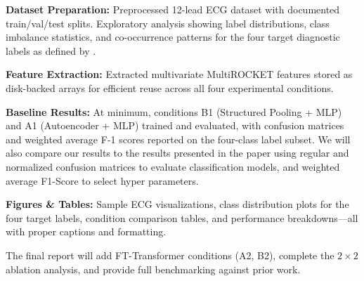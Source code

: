 \documentclass[10pt,twocolumn,letterpaper]{article}
\begin{document}
\textbf{Dataset Preparation:} Preprocessed 12-lead ECG dataset with documented train/val/test splits. Exploratory analysis showing label distributions, class imbalance statistics, and co-occurrence patterns for the four target diagnostic labels as defined by \cite{zheng2022}.

\textbf{Feature Extraction:} Extracted multivariate MultiROCKET features stored as disk-backed arrays for efficient reuse across all four experimental conditions.

\textbf{Baseline Results:} At minimum, conditions B1 (Structured Pooling + MLP) and A1 (Autoencoder + MLP) trained and evaluated, with confusion matrices and weighted average F-1 scores reported on the four-class label subset. We will also compare our results to the results presented in the paper \cite{zheng2022} using regular and normalized confusion matrices to evaluate classification models, and weighted average F1-Score to select hyper parameters. 



\textbf{Figures \& Tables:} Sample ECG visualizations, class distribution plots for the four target labels, condition comparison tables, and performance breakdowns—all with proper captions and formatting.

The final report will add FT-Transformer conditions (A2, B2), complete the $2 \times 2$ ablation analysis, and provide full benchmarking against prior work.

{
\small
\raggedright


}
\end{document}
